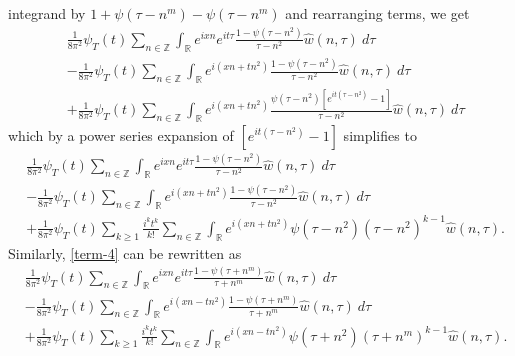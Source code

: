 \documentclass[12pt,reqno]{amsart}
\numberwithin{equation}{section}  %
\numberwithin{figure}{section}
\newcommand{\rr}{\mathbb{R}}
\newcommand{\zz}{\mathbb{Z}}
\newcommand{\wh}{\widehat}
\theoremstyle{plain}
\theoremstyle{definition}
\theoremstyle{remark}
\begin{document}
integrand by $1 + \psi(\tau -
n^m) - \psi(\tau -
n^m) $ and
rearranging terms, we get
%
%
\begin{equation*}
	\begin{split}
	& \frac{1}{8 \pi^2} \psi_{T}(t) \sum_{n \in \zz} \int_\rr e^{ixn}  
		e^{it \tau} \frac{ 1 - \psi(\tau - n^{2}) 
		}{\tau - n^{2}} \wh{w}(n, \tau) \ d \tau
		\\
		& - \frac{1}{8 \pi^2} \psi_{T}(t) \sum_{n \in \zz} \int _\rr e^{i(xn + 
		t n^{2})}
		 \frac{1- \psi(\tau - n^{2})}{\tau - n^{2}} \wh{w}(n, \tau) \ d \tau
		\\
		& + \frac{1}{8 \pi^2} \psi_{T}(t) \sum_{n \in \zz} \int_\rr
		e^{i(xn + t n^{2})}
		\frac{\psi(\tau - n^{2})\left[ e^{it(\tau - n^{2})}-1 
		\right]}{\tau - n^{2}} \wh{w}(n, \tau) \ d \tau
	\end{split}
\end{equation*}
%
%
which by a power series expansion of $[e^{it(\tau - n^{2})}-1]$ simplifies  
to
%
%
\begin{align}
		\label{main-int-expression'-2}
		& \frac{1}{8 \pi^2} \psi_{T}(t) \sum_{n\in \zz} \int_\rr e^{ixn}  
		e^{it \tau} \frac{ 1 - \psi(\tau -  n^{2}) 
		}{\tau -  n^{2}} \wh{w}(n, \tau) \ d \tau
		\\
		\label{main-int-expression'-3}
		& - \frac{1}{8 \pi^2} \psi_{T}(t) \sum_{n\in \zz} \int_\rr e^{i(xn + 
		t n^{2})}
		 \frac{1- \psi(\tau -  n^{2})}{\tau -  n^{2}} \wh{w}(n, \tau) \ d \tau
		\\
		\label{main-int-expression'-4}
		& + \frac{1}{8 \pi^2} \psi_{T}(t) \sum_{k \ge 1} \frac{i^k t^k}{k!}
		\sum_{n \in \zz} \int_\rr e^{i(xn + t n^{2} )}
		\psi(\tau -  n^{2}) (\tau -  n^{2})^{k-1} \wh{w}(n, \tau).
\end{align}
%
Similarly, \eqref{term-4} can be rewritten as
%
\begin{align}
		\label{main-int-expression''-2}
		& \frac{1}{8 \pi^2} \psi_{T}(t) \sum_{n\in \zz} \int_\rr e^{ixn}  
		e^{it \tau} \frac{ 1 - \psi(\tau +  n^m) 
		}{\tau +  n^m} \wh{w}(n, \tau) \ d \tau
		\\
		\label{main-int-expression''-3}
		&  - \frac{1}{8 \pi^2} \psi_{T}(t) \sum_{n\in \zz} \int_\rr e^{i(xn - 
		t n^2)}
		 \frac{1- \psi(\tau +  n^m)}{\tau +  n^m} \wh{w}(n, \tau) \ d \tau
		\\
		\label{main-int-expression''-4}
		& + \frac{1}{8 \pi^2} \psi_{T}(t) \sum_{k \ge 1} \frac{i^k t^k}{k!}
		\sum_{n \in \zz} \int_\rr e^{i(xn - t n^2 )}
		\psi(\tau +  n^2) (\tau +  n^m)^{k-1} \wh{w}(n, \tau).
\end{align}
\end{document}
